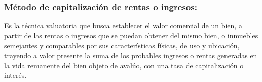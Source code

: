 \documentclass[12pt,a4paper,twoside]{article}
\begin{document}
{\subsubsection{Método de capitalización de rentas o ingresos:}  

Es la técnica valuatoria que  busca  establecer  el  valor  comercial  de  un  bien,  a  partir  de  las  rentas  o  ingresos que  se  puedan  obtener  del  mismo  bien,  o  inmuebles  semejantes  y  comparables  por sus  características  físicas,  de  uso  y  ubicación,  trayendo  a  valor  presente  la  suma  de los  probables  ingresos  o  rentas  generadas  en  la  vida  remanente  del  bien  objeto  de avalúo, con una tasa de capitalización o interés.  


%
%
%
%


}
\end{document}
